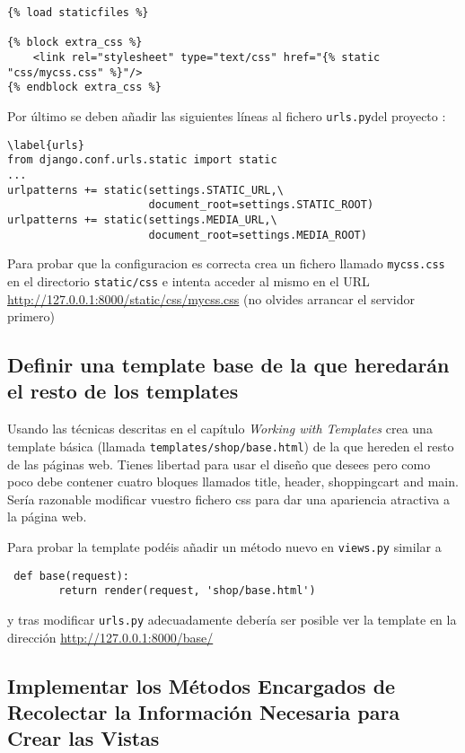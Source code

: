 \documentclass[12pt]{article} %
\newcommand{\urls}{\texttt{urls.py}}%
\begin{document}
\begin{lstlisting}
{% load staticfiles %}

{% block extra_css %}
    <link rel="stylesheet" type="text/css" href="{% static "css/mycss.css" %}"/>
{% endblock extra_css %}
\end{lstlisting}

Por último se deben añadir las siguientes líneas al fichero \urls del proyecto :

\begin{lstlisting}
\label{urls}
from django.conf.urls.static import static
...
urlpatterns += static(settings.STATIC_URL,\
                      document_root=settings.STATIC_ROOT)
urlpatterns += static(settings.MEDIA_URL,\
                      document_root=settings.MEDIA_ROOT)
\end{lstlisting}

Para probar que la configuracion es correcta crea un fichero llamado \texttt{mycss.css}
en el directorio \texttt{static/css} e intenta acceder al mismo en el URL
\url{http://127.0.0.1:8000/static/css/mycss.css} (no olvides arrancar el servidor primero)

\subsection{Definir una template base de la que heredarán el resto de los templates}
   
   Usando las técnicas descritas en el capítulo \textit{Working with Templates} crea una 
template básica (llamada \texttt{templates/shop/base.html}) de la que hereden el resto de las páginas web. Tienes libertad para usar el diseño que desees pero como poco debe contener cuatro bloques llamados title, header, shoppingcart and main. Sería razonable modificar vuestro fichero css para dar una apariencia atractiva a la página web.

Para probar la template podéis añadir un método nuevo en \texttt{views.py} similar a
\begin{verbatim}
 def base(request):
        return render(request, 'shop/base.html')
\end{verbatim}
y tras modificar \texttt{urls.py} adecuadamente debería ser posible ver la template en la dirección \url{http://127.0.0.1:8000/base/}

\subsection{Implementar los Métodos Encargados de Recolectar la Información Necesaria para Crear las Vistas}   
\end{document}
